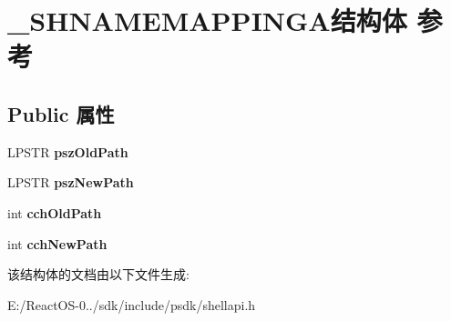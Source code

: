 \hypertarget{struct___s_h_n_a_m_e_m_a_p_p_i_n_g_a}{}\section{\+\_\+\+S\+H\+N\+A\+M\+E\+M\+A\+P\+P\+I\+N\+G\+A结构体 参考}
\label{struct___s_h_n_a_m_e_m_a_p_p_i_n_g_a}
\subsection*{Public 属性}
\begin{DoxyCompactItemize}
\item 
\mbox{\label{struct___s_h_n_a_m_e_m_a_p_p_i_n_g_a_a147b4a3b0d1aada92d91cb278cd8d21f}} 
L\+P\+S\+TR {\bfseries psz\+Old\+Path}
\item 
\mbox{\label{struct___s_h_n_a_m_e_m_a_p_p_i_n_g_a_ae77514c3bbfe148814ed23381f2c3ba6}} 
L\+P\+S\+TR {\bfseries psz\+New\+Path}
\item 
\mbox{\label{struct___s_h_n_a_m_e_m_a_p_p_i_n_g_a_a6320080a8c6b23a2be09751f01715389}} 
int {\bfseries cch\+Old\+Path}
\item 
\mbox{\label{struct___s_h_n_a_m_e_m_a_p_p_i_n_g_a_a187daa71416b0959883aed0c69bf07e7}} 
int {\bfseries cch\+New\+Path}
\end{DoxyCompactItemize}


该结构体的文档由以下文件生成\+:\begin{DoxyCompactItemize}
\item 
E\+:/\+React\+O\+S-\/0../sdk/include/psdk/shellapi.\+h\end{DoxyCompactItemize}
